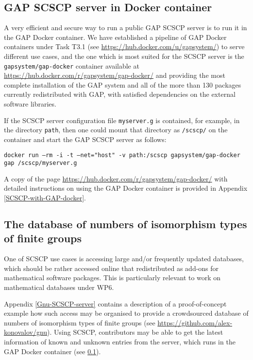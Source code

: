 \documentclass{deliverablereport}
\begin{document}
\subsection{GAP SCSCP server in Docker container}\label{gap-docker}

A very efficient and secure way to run a public GAP SCSCP
server is to run it in the GAP Docker container. 
We have established a pipeline of GAP Docker containers
under Task T3.1 (see \url{https://hub.docker.com/u/gapsystem/})
to serve different use cases, and the one which is most
suited for the SCSCP server is the {\tt gapsystem/gap-docker} 
container available at \url{https://hub.docker.com/r/gapsystem/gap-docker/} and
providing the most complete installation
of the GAP system and all of the more than 130 packages
currently redistributed with GAP, with satisfied dependencies
on the external software libraries.

If the SCSCP server configuration file {\tt myserver.g} is 
contained, for example, in the directory {\tt path}, 
then one could mount that directory as {\tt /scscp/} on the
container and start the GAP SCSCP server as follows:

{\tiny{\tt docker run --rm -i -t --net="host" -v path:/scscp gapsystem/gap-docker gap /scscp/myserver.g}}

A copy of the page \url{https://hub.docker.com/r/gapsystem/gap-docker/}
with detailed instructions on using the GAP Docker container 
is provided in Appendix \ref{SCSCP-with-GAP-docker}.


\subsection{The database of numbers of isomorphism
types of finite groups}\label{gnu-reproducibility}

One of SCSCP use cases is accessing large and/or frequently updated
databases, which should be rather accessed online that redistributed as
add-ons for mathematical software packages. 
This is particularly relevant to work on mathematical databases under WP6.

Appendix \ref{Gnu-SCSCP-server}
contains a description of a proof-of-concept example how such access may
be organised to provide a crowdsourced database of numbers of isomorphism
types of finite groups (see  \url{https://github.com/alex-konovalov/gnu}). 
Using SCSCP, contributors may be able to get the latest information of 
known and unknown entries from the server, which runs in the GAP Docker 
container (see \ref{gap-docker}).
\end{document}
